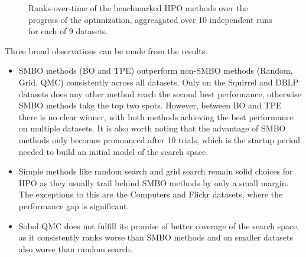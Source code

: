 \begin{figure}
	\centering
	\resizebox{\linewidth}{!}{%
		
	}
	\caption{Ranks-over-time of the benchmarked HPO methods over the progress of the optimization, aggreagated over 10 independent runs for each of 9 datasets.}
	\label{fig:benchmark-ranks}
\end{figure}

Three broad observations can be made from the results.
\begin{itemize}
	\item SMBO methods (BO and TPE) outperform non-SMBO methods (Random, Grid, QMC) consistently across all datasets. Only on the Squirrel and DBLP datasets does any other method reach the second best performance, otherwise SMBO methods take the top two spots. However, between BO and TPE there is no clear winner, with both methods achieving the best performance on multiple datasets. It is also worth noting that the advantage of SMBO methods only becomes pronounced after 10 trials, which is the startup period needed to build an initial model of the search space.
	\item Simple methods like random search and grid search remain solid choices for HPO as they usually trail behind SMBO methods by only a small margin. The exceptions to this are the Computers and Flickr datasets, where the performance gap is significant.
	\item Sobol QMC does not fulfill its promise of better coverage of the search space, as it consistently ranks worse than SMBO methods and on smaller datasets also worse than random search.
\end{itemize}
